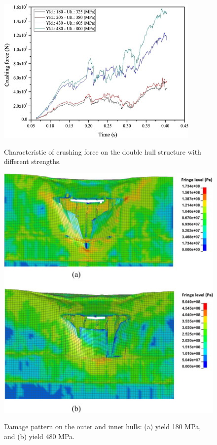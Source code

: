\documentclass[../Final.tex]{subfiles}
\begin{document}
\begin{figure}[ht]
    \centering
    \includegraphics[width=\columnwidth]{fig10.jpg}
    \label{fig10}
    \caption{Characteristic of crushing force on the double hull structure with different strengths.}
\end{figure}

\begin{figure}[ht]
    \centering
    \includegraphics[width=\columnwidth]{fig11.jpg}
    \label{fig11}
    \caption{ Damage pattern on the outer and inner hulls: (a) yield 180 MPa, and (b) yield 480 MPa.}
\end{figure}
\end{document}
